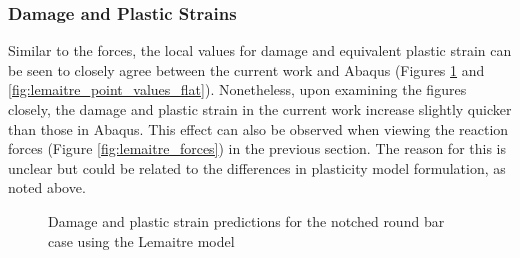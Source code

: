 \documentclass[sn-mathphys,Numbered]{sn-jnl}%
\begin{document}
\subsubsection{Damage and Plastic Strains}
Similar to the forces, the local values for damage and equivalent plastic strain can be seen to closely agree between the current work and Abaqus (Figures \ref{fig:lemaitre_point_values_axi} and \ref{fig:lemaitre_point_values_flat}).
Nonetheless, upon examining the figures closely, the damage and plastic strain in the current work increase slightly quicker than those in Abaqus.
This effect can also be observed when viewing the reaction forces (Figure \ref{fig:lemaitre_forces}) in the previous section.
The reason for this is unclear but could be related to the differences in plasticity model formulation, as noted above.
\begin{figure}[htbp]
	\centering
	\caption{Damage and plastic strain predictions for the notched round bar case using the Lemaitre model}
	\label{fig:lemaitre_point_values_axi}
\end{figure}
\end{document}
